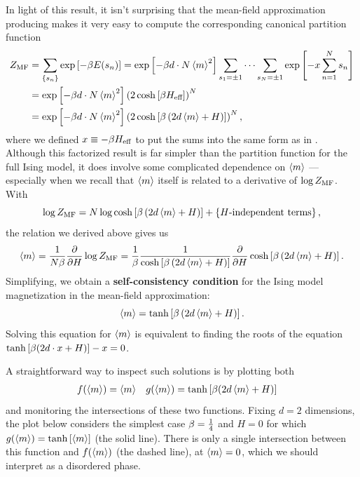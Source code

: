 \newpage %
In light of this result, it isn't surprising that the mean-field approximation producing  makes it very easy to compute the corresponding canonical partition function
\begin{align}
  Z_{\text{MF}} & = \sum_{\left\{s_n\right\}} \exp\left[-\beta E(s_n)\right] = \exp\left[-\beta d\cdot N \left\langle m \right\rangle^2\right] \sum_{s_1 = \pm 1} \cdots \sum_{s_N = \pm 1} \exp\left[-x \sum_{n = 1}^N s_n\right] \cr
       & = \exp\left[-\beta d\cdot N \left\langle m \right\rangle^2\right] \left(2\cosh\left[\beta H_{\text{eff}}\right]\right)^N \nonumber \\
       & = \exp\left[-\beta d\cdot N \left\langle m \right\rangle^2\right] \left(2\cosh\left[\beta \left(2d\left\langle m \right\rangle + H\right)\right]\right)^N,
\end{align}
where we defined $x \equiv -\beta H_{\text{eff}}$ to put the sums into the same form as in .
Although this factorized result is far simpler than the partition function for the full Ising model, it does involve some complicated dependence on $\left\langle m \right\rangle$ --- especially when we recall that $\left\langle m \right\rangle$ itself is related to a derivative of $\log Z_{\text{MF}}$. %
With
\begin{equation*}
  \log Z_{\text{MF}} = N\log \cosh\left[\beta \left(2d\left\langle m \right\rangle + H\right)\right] + \left\{H\mbox{-independent terms}\right\},
\end{equation*}
the relation we derived above gives us
\begin{equation*}
  \left\langle m \right\rangle = \frac{1}{N\beta} \frac{\partial }{\partial H}\log Z_{\text{MF}} = \frac{1}{\beta} \frac{1}{\cosh\left[\beta \left(2d\left\langle m \right\rangle + H\right)\right]} \frac{\partial }{\partial H}\cosh\left[\beta \left(2d\left\langle m \right\rangle + H\right)\right].
\end{equation*}
Simplifying, we obtain a \textbf{self-consistency condition} for the Ising model magnetization in the mean-field approximation:
\begin{equation}
  \label{eq:consistency}
  \left\langle m \right\rangle = \tanh\left[\beta \left(2d\left\langle m \right\rangle + H\right)\right].
\end{equation}
Solving this equation for $\left\langle m \right\rangle$ is equivalent to finding the roots of the equation $\tanh\left[\beta (2d\cdot x + H)\right] - x = 0$.

A straightforward way to inspect such solutions is by plotting both
\begin{align*}
  f(\left\langle m \right\rangle) & = \left\langle m \right\rangle &
  g(\left\langle m \right\rangle) & = \tanh\left[\beta (2d\left\langle m \right\rangle + H)\right]
\end{align*}
and monitoring the intersections of these two functions.
Fixing $d = 2$ dimensions, the plot below considers the simplest case $\beta = \frac{1}{4}$ and $H = 0$ for which $g(\left\langle m \right\rangle) = \tanh\left[\left\langle m \right\rangle\right]$ (the solid line).
There is only a single intersection between this function and $f(\left\langle m \right\rangle)$ (the dashed line), at $\left\langle m \right\rangle = 0$, which we should interpret as a disordered phase.

